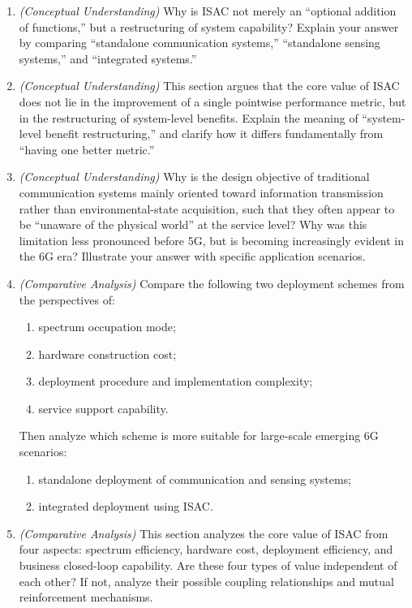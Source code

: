 \begin{enumerate}[label=\textbf{\arabic*.}, leftmargin=*]

    \item \textit{(Conceptual Understanding)} Why is ISAC not merely an ``optional addition of functions,'' but a restructuring of system capability? Explain your answer by comparing ``standalone communication systems,'' ``standalone sensing systems,'' and ``integrated systems.''

    \item \textit{(Conceptual Understanding)} This section argues that the core value of ISAC does not lie in the improvement of a single pointwise performance metric, but in the restructuring of system-level benefits. Explain the meaning of ``system-level benefit restructuring,'' and clarify how it differs fundamentally from ``having one better metric.''

    \item \textit{(Conceptual Understanding)} Why is the design objective of traditional communication systems mainly oriented toward information transmission rather than environmental-state acquisition, such that they often appear to be ``unaware of the physical world'' at the service level? Why was this limitation less pronounced before 5G, but is becoming increasingly evident in the 6G era? Illustrate your answer with specific application scenarios.

    \item \textit{(Comparative Analysis)} Compare the following two deployment schemes from the perspectives of:
    \begin{enumerate}[label=(\alph*)]
        \item spectrum occupation mode;
        \item hardware construction cost;
        \item deployment procedure and implementation complexity;
        \item service support capability.
    \end{enumerate}
    Then analyze which scheme is more suitable for large-scale emerging 6G scenarios:
    \begin{enumerate}[label=(\roman*)]
        \item standalone deployment of communication and sensing systems;
        \item integrated deployment using ISAC.
    \end{enumerate}

    \item \textit{(Comparative Analysis)} This section analyzes the core value of ISAC from four aspects: spectrum efficiency, hardware cost, deployment efficiency, and business closed-loop capability. Are these four types of value independent of each other? If not, analyze their possible coupling relationships and mutual reinforcement mechanisms.


\end{enumerate}
